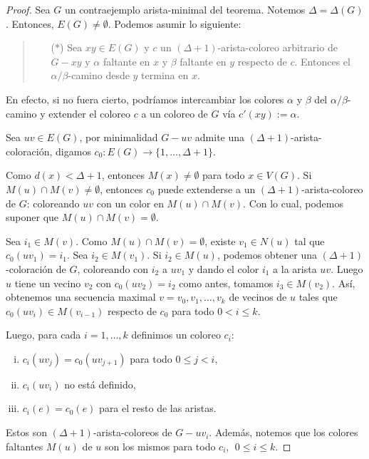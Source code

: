 \documentclass[12pt]{report}
\theoremstyle{plain}
\theoremstyle{definition}
\begin{document}
\begin{proof}
Sea $G$ un contraejemplo arista-minimal del teorema. Notemos $\Delta = \Delta (G)$. Entonces, $E(G) \neq \emptyset$. Podemos asumir lo siguiente:

\begin{quote}
\begin{enumerate}
\item[({$\ast$})]\label{vizing-proof-condition} Sea $xy \in E(G)$ y $c$ un $(\Delta + 1)$-arista-coloreo arbitrario de $G - xy$ y $\alpha$ faltante en $x$ y $\beta$ faltante en $y$ respecto de $c$. Entonces el $\alpha/\beta$-camino desde $y$ termina en $x$.
\end{enumerate}
\end{quote}
En efecto, si no fuera cierto, podríamos intercambiar los colores $\alpha$ y $\beta$ del $\alpha/\beta$-camino y extender el coloreo $c$ a un coloreo de $G$ vía $c'(xy):= \alpha$.

Sea $uv \in E(G)$, por minimalidad $G -uv$ admite una $(\Delta +1)$-arista-coloración, digamos $c_0: E(G) \rightarrow \{1, \ldots, \Delta + 1\}$.

\InscapeDEPRECADO{}

Como $d(x) < \Delta + 1$, entonces $M(x) \neq \emptyset$ para todo $x \in V(G)$. Si $M(u) \cap M(v) \neq \emptyset$, entonces $c_0$ puede extenderse a un $(\Delta + 1)$-arista-coloreo de $G$: coloreando $uv$ con un color en $M(u) \cap M(v)$. Con lo cual, podemos suponer que $M(u) \cap M(v) = \emptyset$.

Sea $i_1 \in M(v)$. Como $M(u) \cap M(v)  = \emptyset$, existe $v_1 \in N(u)$ tal que $c_0(uv_1) = i_1$. Sea $i_2 \in M(v_1)$. Si $i_2 \in M(u)$, podemos obtener una $(\Delta+1)$-coloración de $G$, coloreando con $i_2$ a $uv_1$ y dando el color $i_1$ a la arista $uv$. Luego $u$ tiene un vecino $v_2$ con $c_0(uv_2) = i_2$ como antes, tomamos $i_3 \in M(v_2)$. Así, obtenemos una secuencia maximal $v = v_0, v_1, \ldots, v_k$ de vecinos de $u$ tales que $c_0 (uv_i) \in M(v_{i-1})$ respecto de $c_0$ para todo $0 < i \leq k$.

Luego, para cada $i = 1, \ldots, k$ definimos un coloreo $c_i$:
\begin{enumerate}[(i)]
\item $c_i (uv_j) = c_0 (u v_{j+1})$ para todo $0 \leq j < i$,
\item $c_i (uv_i)$ no está definido,
\item $c_i (e) = c_0 (e)$ para el resto de las aristas.
\end{enumerate}
Estos son $(\Delta + 1)$-arista-coloreos de $G-uv_i$. Además, notemos que los colores faltantes $M(u)$ de $u$ son los mismos para todo $c_i, \: \: 0 \leq i \leq k$.


\end{proof}
\end{document}
